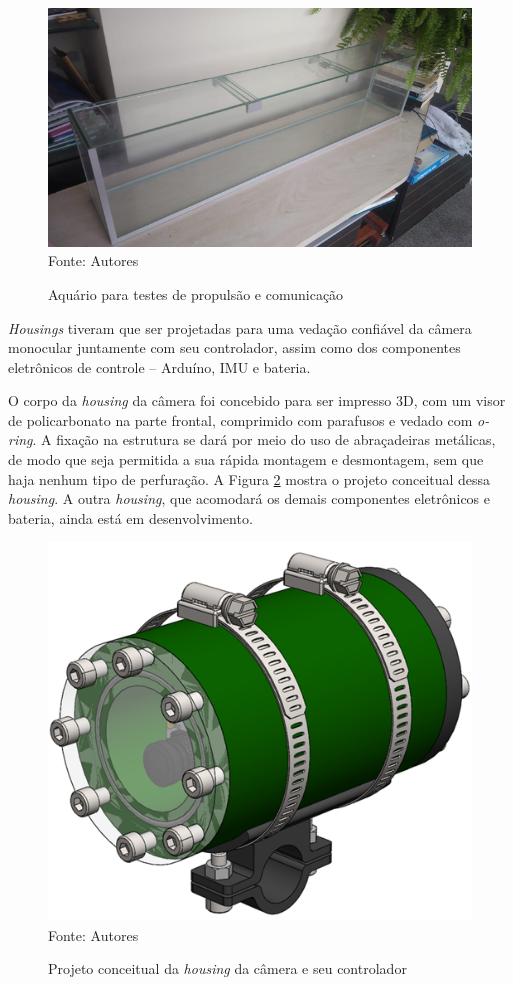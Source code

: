 \begin{figure}[h]
	\centering
	\caption{Aquário para testes de propulsão e comunicação}
	\label{fig:aquario}
	\includegraphics[width=0.8\linewidth]{images/aquario}\\
	\footnotesize Fonte: Autores
\end{figure}

\textit{Housings} tiveram que ser projetadas para uma vedação confiável da câmera monocular juntamente com seu controlador, assim como dos componentes eletrônicos de controle -- Arduíno, IMU e bateria. 

O corpo da \textit{housing} da câmera foi concebido para ser impresso 3D, com um visor de policarbonato na parte frontal, comprimido com parafusos e vedado com \textit{o-ring}. A fixação na estrutura se dará por meio do uso de abraçadeiras metálicas, de modo que seja permitida a sua rápida montagem e desmontagem, sem que haja nenhum tipo de perfuração. A Figura \ref{fig:housing-camera} mostra o projeto conceitual dessa \textit{housing}. A outra \textit{housing}, que acomodará os demais componentes eletrônicos e bateria, ainda está em desenvolvimento.

\begin{figure}[h]
	\centering
	\caption{Projeto conceitual da \textit{housing} da câmera e seu controlador}
	\label{fig:housing-camera}
	\includegraphics[width=0.5\linewidth]{images/housing-camera}\\
	\footnotesize Fonte: Autores
\end{figure}


